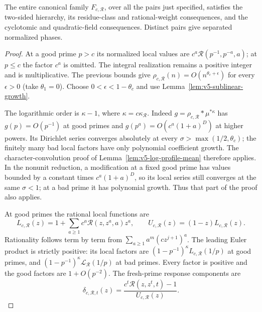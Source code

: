 \begin{theorem}
\label{thm:v5-rough-product}
The entire canonical family $F_{c,\mathcal R}$, over all the pairs
just specified, satisfies the two-sided hierarchy, its residue-class
and rational-weight consequences, and the cyclotomic and quadratic-field
consequences.  Distinct pairs give separated normalized phases.
\end{theorem}
\begin{proof}
At a good prime $p>c$ its normalized local values are
$c^a\mathcal R(p^{-1},p^{-a},a)$; at $p\leq c$ the factor $c^a$
is omitted.  The integral realization remains a positive integer
and is multiplicative.  The previous bounds give
$\rho_{c,\mathcal R}(n)=O(n^{\theta_c+\epsilon})$ for every
$\epsilon>0$ (take $\theta_1=0$).  Choose
$0<\epsilon<1-\theta_c$ and use
Lemma~\ref{lem:v5-sublinear-growth}.

The logarithmic order is $\kappa-1$, where
$\kappa=c\kappa_{\mathcal R}$.  Indeed
$g=\rho_{c,\mathcal R}*\mu^{*\kappa}$ has $g(p)=O(p^{-1})$ at
good primes and $g(p^a)=O(c^a(1+a)^D)$ at higher powers.
Its Dirichlet series converges absolutely at every
$\sigma>\max(1/2,\theta_c)$; the finitely many bad local factors
have only polynomial coefficient growth.  The character-convolution
proof of Lemma~\ref{lem:v5-log-profile-mean} therefore applies.
In the nonunit reduction, a modification at a fixed good prime has
values bounded by a constant times $c^a(1+a)^D$, so its local series
still converges at the same $\sigma<1$; at a bad prime it has polynomial
growth.  Thus that part of the proof also applies.

At good primes the rational local functions are
\[
 L_{c,\mathcal R}(z)
  =1+\sum_{a\geq1}c^a\mathcal R(z,z^a,a)z^a,
 \qquad U_{c,\mathcal R}(z)=(1-z)L_{c,\mathcal R}(z).
\]
Rationality follows term by term from
$\sum_{a\geq1}a^m(cz^{j+1})^a$.  The leading Euler product is
strictly positive: its local factors are
$(1-p^{-1})^\kappa L_{c,\mathcal R}(1/p)$ at good primes,
and $(1-p^{-1})^\kappa\mathcal L_{\mathcal R}(1/p)$ at bad primes.
Every factor is positive and the good factors are $1+O(p^{-2})$.
The fresh-prime response components are
\[
 \delta_{c,\mathcal R,t}(z)=
 \frac{c^t\mathcal R(z,z^t,t)-1}{U_{c,\mathcal R}(z)}.
\]


\end{proof}
